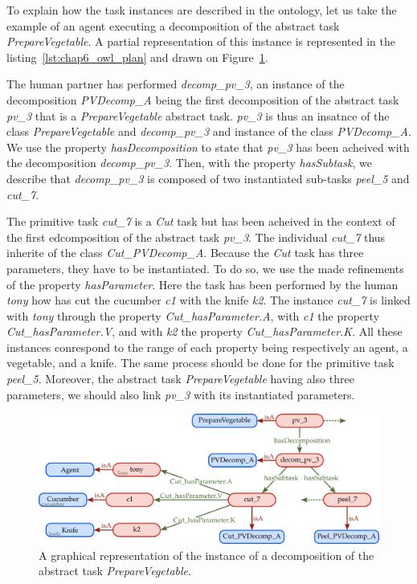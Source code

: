To explain how the task instances are described in the ontology, let us take the example of an agent executing a decomposition of the abstract task \textit{PrepareVegetable}. A partial representation of this instance is represented in the listing~\ref{lst:chap6_owl_plan} and drawn on Figure~\ref{fig:chap6_abox}.

The human partner has performed \textit{decomp\_pv\_3}, an instance of the decomposition \textit{PVDecomp\_A} being the first decomposition of the abstract task \textit{pv\_3} that is a \textit{PrepareVegetable} abstract task. \textit{pv\_3} is thus an insatnce of the class \textit{PrepareVegetable} and \textit{decomp\_pv\_3} and instance of the class \textit{PVDecomp\_A}. We use the property \textit{hasDecomposition} to state that \textit{pv\_3} has been acheived with the decomposition \textit{decomp\_pv\_3}. Then, with the property \textit{hasSubtask}, we describe that \textit{decomp\_pv\_3} is composed of two instantiated sub-tasks \textit{peel\_5} and \textit{cut\_7}.

The primitive task \textit{cut\_7} is a \textit{Cut} task but has been acheived in the context of the first edcomposition of the abstract task \textit{pv\_3}. The individual \textit{cut\_7} thus inherite of the class  \textit{Cut\_PVDecomp\_A}. Because the \textit{Cut} task has three parameters, they have to be instantiated. To do so, we use the made refinements of the property \textit{hasParameter}. Here the task has been performed by the human \textit{tony} how has cut the cucumber \textit{c1} with the knife \textit{k2}. The instance \textit{cut\_7} is linked with \textit{tony} through the property \textit{Cut\_hasParameter.A}, with \textit{c1} the property \textit{Cut\_hasParameter.V}, and with \textit{k2} the property \textit{Cut\_hasParameter.K}. All these instances conrespond to the range of each property being respectively an agent, a vegetable, and a knife. The same process should be done for the primitive task \textit{peel\_5}. Moreover, the abstract task \textit{PrepareVegetable} having also three parameters, we should also link \textit{pv\_3} with its instantiated parameters.

\begin{figure}[h!]
\centering
\includegraphics[width=\textwidth]{figures/chapter6/abox.png}
\caption{\label{fig:chap6_abox} A graphical representation of the instance of a decomposition of the abstract task \textit{PrepareVegetable}.}
\end{figure}

